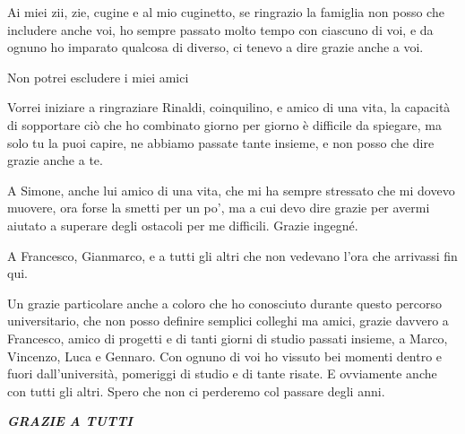 \documentclass[tesi]{subfiles}
\begin{document}
Ai miei zii, zie, cugine e al mio cuginetto, se ringrazio la famiglia non posso che includere anche voi, ho sempre passato molto tempo con ciascuno di voi, e da ognuno ho imparato qualcosa di diverso, ci tenevo a dire grazie anche a voi. 


Non potrei escludere i miei amici


Vorrei iniziare a ringraziare Rinaldi, coinquilino, e amico di una vita, la capacità di sopportare ciò che ho combinato giorno per giorno è difficile da spiegare, ma solo tu la puoi capire, ne abbiamo passate tante insieme, e non posso che dire grazie anche a te. 


A Simone, anche lui amico di una vita, che mi ha sempre stressato che mi dovevo muovere, ora forse la smetti per un po’, ma a cui devo dire grazie per avermi aiutato a superare degli ostacoli per me difficili. Grazie ingegné.


A Francesco, Gianmarco, e a tutti gli altri che non vedevano l’ora che arrivassi fin qui.


Un grazie particolare anche a coloro che ho conosciuto durante questo percorso universitario, che non posso definire semplici colleghi ma amici, grazie davvero a Francesco, amico di progetti e di tanti giorni di studio passati insieme, a Marco, Vincenzo, Luca e Gennaro. Con ognuno di voi ho vissuto bei momenti dentro e fuori dall’università, pomeriggi di studio e di tante risate. E ovviamente anche con tutti gli altri. Spero che non ci perderemo col passare degli anni.

\begin{center}
\begin{large}
\textit{
\textbf{GRAZIE A TUTTI}}
\end{large}
\end{center}
\end{document}
